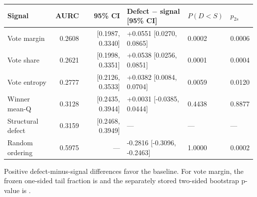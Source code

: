\begin{table}[t]
\centering
\small
\begin{tabular}{lrrlll}
\toprule
Signal & AURC & 95\% CI & Defect $-$ signal [95\% CI] & $P(D<S)$ & $p_{2s}$ \\
\midrule
Vote margin & 0.2608 & [0.1987, 0.3340] & +0.0551 [0.0270, 0.0865] & 0.0002 & 0.0006 \\
Vote share & 0.2621 & [0.1998, 0.3351] & +0.0538 [0.0256, 0.0851] & 0.0001 & 0.0004 \\
Vote entropy & 0.2777 & [0.2126, 0.3533] & +0.0382 [0.0084, 0.0704] & 0.0059 & 0.0120 \\
Winner mean-Q & 0.3128 & [0.2435, 0.3944] & +0.0031 [-0.0385, 0.0444] & 0.4438 & 0.8877 \\
Structural defect & 0.3159 & [0.2468, 0.3949] & --- & --- & --- \\
Random ordering & 0.5975 & --- & -0.2816 [-0.3096, -0.2463] & 1.0000 & 0.0002 \\
\bottomrule
\end{tabular}
\parbox{\linewidth}{\footnotesize Positive defect-minus-signal differences favor the baseline. For vote margin, the frozen one-sided tail fraction is \MarginTailProbability{} and the separately stored two-sided bootstrap p-value is \MarginTwoSidedP{}.}
\end{table}
